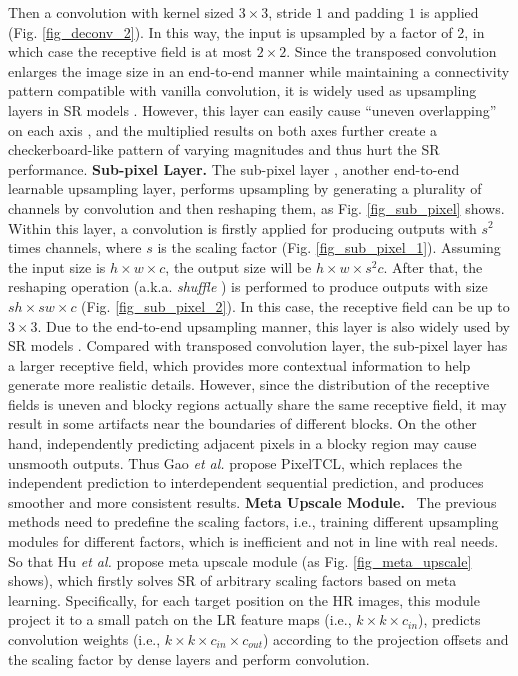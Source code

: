 {Then a convolution with kernel sized $3 \times 3$, stride $1$ and padding $1$ is applied (Fig. \ref{fig_deconv_2}).
In this way, the input is upsampled by a factor of 2, in which case the receptive field is at most $2 \times 2$.
Since the transposed convolution enlarges the image size in an end-to-end manner while maintaining a connectivity pattern compatible with vanilla convolution, it is widely used as upsampling layers in SR models .
However, this layer can easily cause ``uneven overlapping'' on each axis , and the multiplied results on both axes further create a checkerboard-like pattern of varying magnitudes and thus hurt the SR performance.
\textbf{Sub-pixel Layer.}
The sub-pixel layer , another end-to-end learnable upsampling layer, performs upsampling by generating a plurality of channels by convolution and then reshaping them, as Fig. \ref{fig_sub_pixel} shows.
Within this layer, a convolution is firstly applied for producing outputs with $s^2$ times channels, where $s$ is the scaling factor (Fig. \ref{fig_sub_pixel_1}).
Assuming the input size is $h \times w \times c$, the output size will be $h \times w \times s^2 c$.
After that, the reshaping operation (a.k.a. \textit{shuffle} ) is performed to produce outputs with size $sh \times sw \times c$ (Fig. \ref{fig_sub_pixel_2}).
In this case, the receptive field can be up to $3 \times 3$.
Due to the end-to-end upsampling manner, this layer is also widely used by SR models .
Compared with transposed convolution layer, the sub-pixel layer has a larger receptive field, which provides more contextual information to help generate more realistic details.
However, since the distribution of the receptive fields is uneven and blocky regions actually share the same receptive field, it may result in some artifacts near the boundaries of different blocks.
On the other hand, independently predicting adjacent pixels in a blocky region may cause unsmooth outputs.
Thus Gao \textit{et al.}  propose PixelTCL, which replaces the independent prediction to interdependent sequential prediction, and produces smoother and more consistent results.
\textbf{Meta Upscale Module.}
 The previous methods need to predefine the scaling factors, i.e., training different upsampling modules for different factors, which is inefficient and not in line with real needs.
So that Hu \textit{et al.}  propose meta upscale module (as Fig. \ref{fig_meta_upscale} shows), which firstly solves SR of arbitrary scaling factors based on meta learning.
Specifically, for each target position on the HR images, this module project it to a small patch on the LR feature maps (i.e., $k \times k \times c_{in}$), predicts convolution weights (i.e., $k \times k \times c_{in} \times c_{out}$) according to the projection offsets and the scaling factor by dense layers and perform convolution.
}
